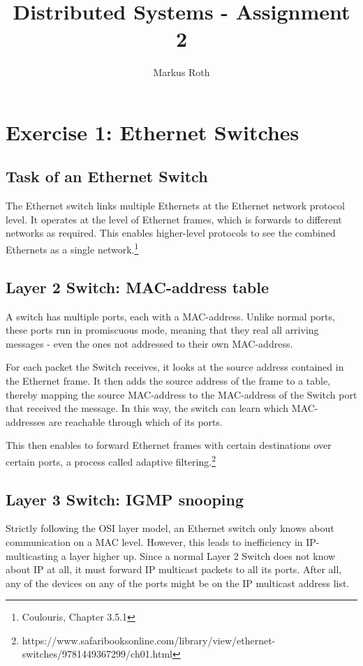 \documentclass[a4paper]{article}
\title{Distributed Systems - Assignment 2}
\author{Markus Roth}
\begin{document}
\maketitle

\section{Exercise 1: Ethernet Switches}


\subsection{Task of an Ethernet Switch}

The Ethernet switch links multiple Ethernets at the Ethernet network protocol level. It operates at the level of Ethernet frames, which is forwards to different networks as required. This enables higher-level protocols to see the combined Ethernets as a single network.\footnote{Coulouris, Chapter 3.5.1}

\subsection{Layer 2 Switch: MAC-address table}



A switch has multiple ports, each with a MAC-address. Unlike normal ports, these ports run in promiscuous mode, meaning that they real all arriving messages - even the ones not addressed to their own MAC-address. 

For each packet the Switch receives, it looks at the source address contained in the Ethernet frame. It then adds the source address of the frame to a table, thereby mapping the source MAC-address to the MAC-address of the Switch port that received the message. In this way, the switch can learn which MAC-addresses are reachable through which of its ports.

This then enables to forward Ethernet frames with certain destinations over certain ports, a process called adaptive filtering.\footnote{https://www.safaribooksonline.com/library/view/ethernet-switches/9781449367299/ch01.html}

\subsection{Layer 3 Switch: IGMP snooping}

Strictly following the OSI layer model, an Ethernet switch only knows about communication on a MAC level. However, this leads to inefficiency in IP-multicasting a layer higher up. Since a normal Layer 2 Switch does not know about IP at all, it must forward IP multicast packets to all its ports. After all, any of the devices on any of the ports might be on the IP multicast address list.
\end{document}
